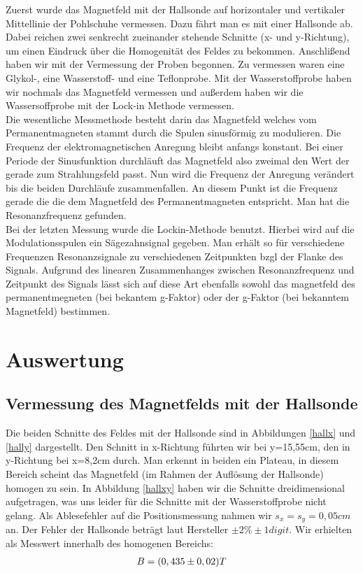 \documentclass[12pt]{article}
\begin{document}
Zuerst wurde das Magnetfeld mit der Hallsonde auf horizontaler und vertikaler Mittellinie der Pohlschuhe vermessen.
Dazu fährt man es mit einer Hallsonde ab. Dabei reichen zwei senkrecht zueinander stehende Schnitte (x- und y-Richtung), um einen Eindruck über die Homogenität des Feldes zu bekommen.
 Anschlißend haben wir mit der Vermessung der Proben begonnen. Zu vermessen waren eine Glykol-, eine Wasserstoff- und eine Teflonprobe. Mit der Wasserstoffprobe haben wir nochmals das Magnetfeld vermessen und außerdem haben wir die Wassersoffprobe mit der Lock-in Methode vermessen.\\


Die wesentliche Messmethode besteht darin das Magnetfeld welches vom Permanentmagneten stammt durch die Spulen sinusförmig zu modulieren. Die Frequenz der elektromagnetischen Anregung bleibt anfangs konstant. Bei einer Periode der Sinusfunktion durchläuft das Magnetfeld also zweimal den Wert der gerade zum Strahlungsfeld passt. Nun wird die Frequenz der Anregung verändert bis die beiden Durchläufe zusammenfallen. An diesem Punkt ist die Frequenz gerade die die dem Magnetfeld des Permanentmagneten entspricht. Man hat die Resonanzfrequenz gefunden.\\

Bei der letzten Messung wurde die Lockin-Methode benutzt. Hierbei wird auf die Modulationsspulen ein Sägezahnsignal gegeben. Man erhält so für verschiedene Frequenzen Resonanzsignale zu verschiedenen Zeitpunkten bzgl der Flanke des Signals. Aufgrund des linearen Zusammenhanges zwischen Resonanzfrequenz und Zeitpunkt des Signals lässt sich auf diese Art ebenfalls sowohl das magnetfeld des permanentmegneten (bei bekantem g-Faktor) oder der g-Faktor (bei bekanntem Magnetfeld) bestimmen.

\section{Auswertung}
\subsection{Vermessung des Magnetfelds mit der Hallsonde}
Die beiden Schnitte des Feldes mit der Hallsonde sind in Abbildungen \ref{hallx} und \ref{hally} dargestellt. Den Schnitt in x-Richtung führten wir bei y=15,55cm, den in y-Richtung bei x=8,2cm durch. Man erkennt in beiden ein Plateau, in diesem Bereich scheint das Magnetfeld (im Rahmen der Auflösung der Hallsonde) homogen zu sein. In Abbildung \ref{hallxy} haben wir die Schnitte dreidimensional aufgetragen, was uns leider für die Schnitte mit der Wasserstoffprobe nicht gelang. Als Ablesefehler auf die Positionsmessung nahmen wir $s_x = s_y = 0,05cm$ an. Der Fehler der Hallsonde beträgt laut Hersteller $\pm 2\% \pm 1digit$. Wir erhielten als Messwert innerhalb des homogenen Bereichs:
\begin{align}
 \notag B=(0,435 \pm 0,02) T
\end{align}
\end{document}
